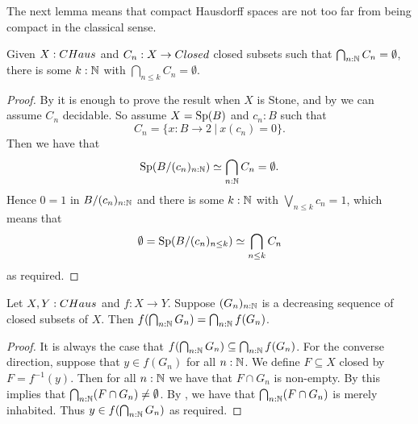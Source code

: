 The next lemma means that compact Hausdorff spaces are not too far from being compact in the classical sense.

\begin{lemma}\label{CHausFiniteIntersectionProperty}
  Given $X:\Chaus$ and $C_n:X\to \Closed$ closed subsets such that $\bigcap_{n:\mathbb{N}} C_n =\emptyset$, there is some $k:\mathbb{N}$ 
  with $\bigcap_{n\leq k} C_n  = \emptyset$. 
\end{lemma}
\begin{proof}
  By  it is enough to prove the result when $X$ is Stone, and by  we can assume $C_n$ decidable.
  So assume 
  $X=\operatorname{Sp}(B)$ and $c_n:B$ such that
  \[C_n = \{x:B\to 2\ |\ x(c_n) = 0\}.\]
  Then we have that
  \[\Sp(B/(c_n)_{n:\N})%
  \simeq \bigcap_{n:\N} C_n = \emptyset .\]
  Hence 
  $0=1$ in $B/(c_n)_{n:\mathbb{N}}$ %
  and there is some $k:\mathbb{N}$ with 
  $\bigvee_{n\leq k} c_n = 1$, which means that
  \[\emptyset = \Sp(B/(c_n)_{n\leq k}) %
  \simeq \bigcap_{n\leq k} C_n \]
  as required.
\end{proof}

\begin{corollary}\label{ChausMapsPreserveIntersectionOfClosed}
  Let $X,Y:\CHaus$ and $f:X \to Y$. 
  Suppose $(G_n)_{n:\mathbb{N}}$ is a decreasing sequence of closed subsets of $X$. 
  Then $f(\bigcap_{n:\mathbb{N}} G_n) = \bigcap_{n:\mathbb{N}}f(G_n)$. 
\end{corollary}
\begin{proof}
  It is always the case that $f(\bigcap_{n:\mathbb{N}} G_n) \subseteq \bigcap_{n:\mathbb{N}} f(G_n)$. 
  For the converse direction, suppose that $y \in f(G_n)$ for all $n:\mathbb{N}$. 
  We define $F\subseteq X$ closed by $F=f^{-1}(y)$. 
  Then for all $n:\mathbb{N}$ we have that $F\cap G_n$ is %
  non-empty. 
  By  this implies that $\bigcap_{n:\mathbb{N}}(F\cap G_n) \neq \emptyset$. 
  By ,  we have that %
  $\bigcap_{n:\mathbb{N}} (F\cap G_n)$ is merely inhabited. Thus $y\in f(\bigcap_{n:\mathbb{N}} G_n)$ as required. 
\end{proof}

